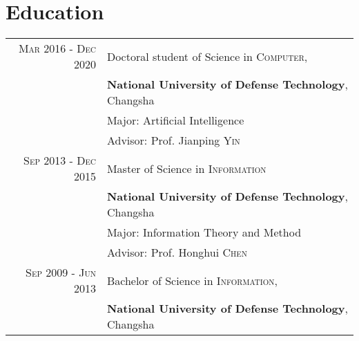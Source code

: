 \documentclass[a4paper,10pt]{article}
\begin{document}

\section{Education}
\begin{tabular}{rl}	
 \textsc{Mar} 2016 - \textsc{Dec} 2020 & Doctoral student of Science in \textsc{Computer},\\ &\textbf{National University of Defense Technology}, Changsha\\
& Major: Artificial Intelligence\\
& \small Advisor: Prof. Jianping \textsc{Yin}\\
\textsc{Sep} 2013 - \textsc{Dec} 2015 & Master of Science in \textsc{Information} \\& \normalsize\textbf{National University of Defense Technology}, Changsha\\
& Major: Information Theory and Method\\
&\small Advisor: Prof. Honghui \textsc{Chen}\\
\textsc{Sep} 2009 - \textsc{Jun} 2013 & Bachelor of Science in \textsc{Information},\\ 
&\textbf{National University of Defense Technology}, Changsha\\
\end{tabular}
\end{document}

